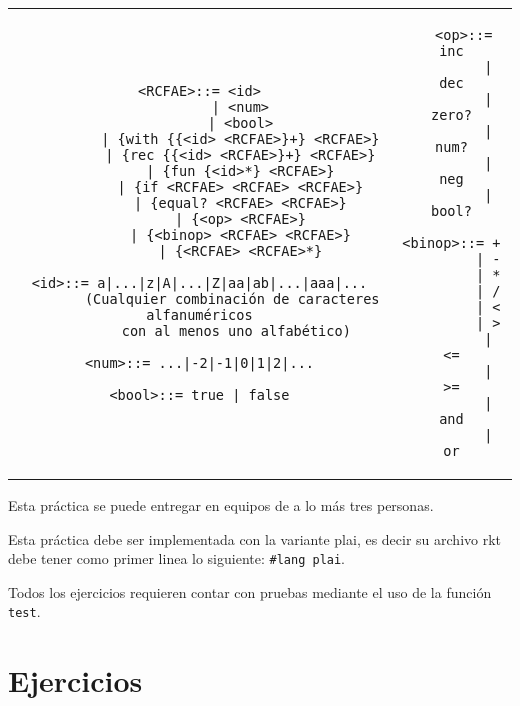 \documentclass{article}
\begin{document}
\begin{tabular}{c c}
  \begin{minipage}[t]{10cm}
\begin{verbatim}
<RCFAE>::= <id>
          | <num>
          | <bool>
          | {with {{<id> <RCFAE>}+} <RCFAE>}
          | {rec {{<id> <RCFAE>}+} <RCFAE>}
          | {fun {<id>*} <RCFAE>}
          | {if <RCFAE> <RCFAE> <RCFAE>}
          | {equal? <RCFAE> <RCFAE>}
          | {<op> <RCFAE>}
          | {<binop> <RCFAE> <RCFAE>}
          | {<RCFAE> <RCFAE>*}

<id>::= a|...|z|A|...|Z|aa|ab|...|aaa|...
        (Cualquier combinación de caracteres alfanuméricos
         con al menos uno alfabético)

<num>::= ...|-2|-1|0|1|2|...

<bool>::= true | false

\end{verbatim}
  \end{minipage}
  &
  \begin{minipage}[t]{6cm}
\begin{verbatim}
   <op>::= inc
         | dec
         | zero?
         | num?
         | neg
         | bool?

<binop>::= +
         | -
         | *
         | /
         | <
         | >
         | <=
         | >=
         | and
         | or

\end{verbatim}
  \end{minipage}
\end{tabular}

Esta práctica se puede entregar en equipos de a lo más tres
personas.

Esta práctica debe ser implementada con la variante plai, es decir
su archivo rkt debe tener como primer linea lo siguiente:
\texttt{\#lang plai}.

Todos los ejercicios requieren contar con pruebas mediante el uso de
la función \texttt{test}.

\section{Ejercicios}
\end{document}
